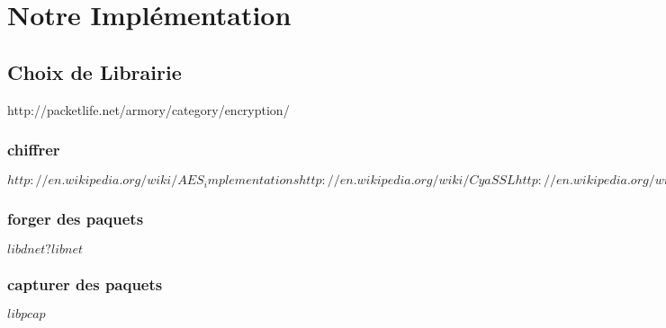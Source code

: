 \documentclass[12pt]{article}
\begin{document}
\clearpage 
 
\section{Notre Implémentation} 
 
\subsection{Choix de Librairie}

http://packetlife.net/armory/category/encryption/

\subsubsection{chiffrer}
$http://en.wikipedia.org/wiki/AES_implementations
http://en.wikipedia.org/wiki/CyaSSL
http://en.wikipedia.org/wiki/GnuTLS
http://en.wikipedia.org/wiki/PolarSSL
http://en.wikipedia.org/wiki/OpenSSL$

\subsubsection{forger des paquets}
$libdnet ?
libnet$

\subsubsection{capturer des paquets}
$libpcap$
\end{document}
